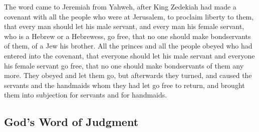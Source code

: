  The word came to Jeremiah from Yahweh, after King
Zedekiah had made a covenant with all the people who were at Jerusalem,
to proclaim liberty to them,  that every man should let
his male servant, and every man his female servant, who is a Hebrew or a
Hebrewess, go free, that no one should make bondservants of them, of a
Jew his brother.  All the princes and all the people
obeyed who had entered into the covenant, that everyone should let his
male servant and everyone his female servant go free, that no one should
make bondservants of them any more. They obeyed and let them go,
 but afterwards they turned, and caused the servants and
the handmaids whom they had let go free to return, and brought them into
subjection for servants and for handmaids.

\hypertarget{gods-word-of-judgment}{%
\subsection{God's Word of Judgment}\label{gods-word-of-judgment}}

